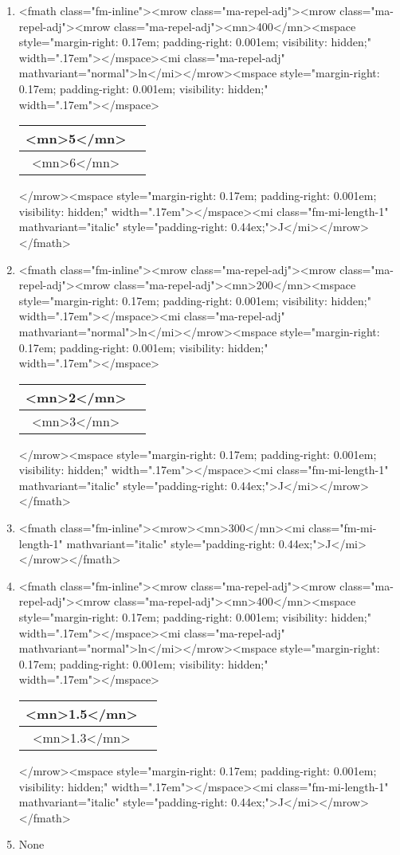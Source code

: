 \documentclass{article}
\begin{document}
\begin{enumerate}[label=(\alph*)]
\item  <fmath class="fm-inline"><mrow class="ma-repel-adj"><mrow class="ma-repel-adj"><mrow class="ma-repel-adj"><mn>400</mn><mspace style="margin-right: 0.17em; padding-right: 0.001em; visibility: hidden;" width=".17em">‌</mspace><mi class="ma-repel-adj" mathvariant="normal">ln</mi></mrow><mspace style="margin-right: 0.17em; padding-right: 0.001em; visibility: hidden;" width=".17em">‌</mspace>\begin{tabular}{|c|c|}
\hline
<mn>5</mn> \\
\hline
<mn>6</mn> \\
\hline
\end{tabular}
</mrow><mspace style="margin-right: 0.17em; padding-right: 0.001em; visibility: hidden;" width=".17em">‌</mspace><mi class="fm-mi-length-1" mathvariant="italic" style="padding-right: 0.44ex;">J</mi></mrow></fmath>
\item  <fmath class="fm-inline"><mrow class="ma-repel-adj"><mrow class="ma-repel-adj"><mrow class="ma-repel-adj"><mn>200</mn><mspace style="margin-right: 0.17em; padding-right: 0.001em; visibility: hidden;" width=".17em">‌</mspace><mi class="ma-repel-adj" mathvariant="normal">ln</mi></mrow><mspace style="margin-right: 0.17em; padding-right: 0.001em; visibility: hidden;" width=".17em">‌</mspace>\begin{tabular}{|c|c|}
\hline
<mn>2</mn> \\
\hline
<mn>3</mn> \\
\hline
\end{tabular}
</mrow><mspace style="margin-right: 0.17em; padding-right: 0.001em; visibility: hidden;" width=".17em">‌</mspace><mi class="fm-mi-length-1" mathvariant="italic" style="padding-right: 0.44ex;">J</mi></mrow></fmath>
\item  <fmath class="fm-inline"><mrow><mn>300</mn><mi class="fm-mi-length-1" mathvariant="italic" style="padding-right: 0.44ex;">J</mi></mrow></fmath>
\item  <fmath class="fm-inline"><mrow class="ma-repel-adj"><mrow class="ma-repel-adj"><mrow class="ma-repel-adj"><mn>400</mn><mspace style="margin-right: 0.17em; padding-right: 0.001em; visibility: hidden;" width=".17em">‌</mspace><mi class="ma-repel-adj" mathvariant="normal">ln</mi></mrow><mspace style="margin-right: 0.17em; padding-right: 0.001em; visibility: hidden;" width=".17em">‌</mspace>\begin{tabular}{|c|c|}
\hline
<mn>1.5</mn> \\
\hline
<mn>1.3</mn> \\
\hline
\end{tabular}
</mrow><mspace style="margin-right: 0.17em; padding-right: 0.001em; visibility: hidden;" width=".17em">‌</mspace><mi class="fm-mi-length-1" mathvariant="italic" style="padding-right: 0.44ex;">J</mi></mrow></fmath>
\item None
\end{enumerate}
\newpage
\end{document}
